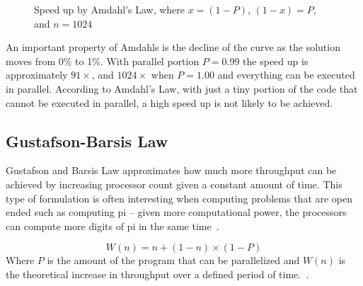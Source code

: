 \begin{figure}[htb]
  \centering
  
  \caption{Speed up by Amdahl's Law, where $x=(1-P)$, $(1-x)=P$, and $n=1024$}
  \label{fig:amdahls law}
\end{figure}

An important property of Amdahls is the decline of the curve as the solution moves from 0\% to 1\%.
With parallel portion $P=0.99$ the speed up is approximately $91\times$, and $1024\times$ when $P=1.00$ and everything can be executed in parallel.
According to Amdahl's Law, with just a tiny portion of the code that cannot be executed in parallel, a high speed up is not likely to be achieved.


\subsection{Gustafson-Barsis Law}
\label{sec:gustafson-barsis law}

Gustafson and Barsis Law approximates how much more throughput can be achieved by increasing processor count given a constant amount of time.
This type of formulation is often interesting when computing problems that are open ended such as computing pi -- given more computational power, the processors can compute more digits of pi in the same time~\cite{amdahlorgustafson2011}.

\begin{equation}
  \label{eq:gustafson-barsis law}
  W(n) = n + (1-n) \times (1-P)
\end{equation}
Where $P$ is the amount of the program that can be parallelized and $W(n)$ is the theoretical increase in throughput over a defined period of time.~\cite{gustafson1988reevaluating}.

